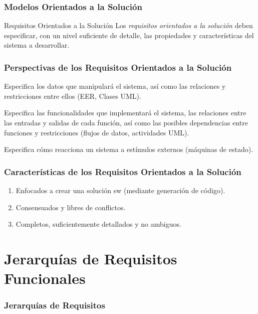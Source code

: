 \documentclass[slidestop,xcolor=pst,dvips,blue]{beamer}
\begin{document}
\begin{frame}[c]
    \frametitle{Modelos Orientados a la Solución}
    \begin{block}{Requisitos Orientados a la Solución}
        Los \emph{requisitos orientados a la solución} deben especificar, con un nivel suficiente de detalle, las propiedades y características del sistema a desarrollar.
    \end{block}
\end{frame}

\begin{frame}[c]
    \frametitle{Perspectivas de los Requisitos Orientados a la Solución}
    \begin{description}[<+->]
        \item[Datos] Especifica los datos que manipulará el sistema, así como las relaciones y restricciones entre ellos (EER, Clases UML).
        \item[Funcional] Especifica las funcionalidades que implementará el sistema, las relaciones entre las entradas y salidas de cada función, así como las posibles dependencias entre funciones y restricciones (flujos de datos, actividades UML).
        \item[Comportamiento] Especifica cómo reacciona un sistema a estímulos externos (máquinas de estado).
    \end{description}
\end{frame}

\begin{frame}[c]
    \frametitle{Características de los Requisitos Orientados a la Solución}
    \begin{enumerate}[<+->]
        \item Enfocados a crear una solución sw (mediante generación de código).
        \item Consensuados y libres de conflictos.
        \item Completos, suficientemente detallados y no ambiguos.
    \end{enumerate}
\end{frame}

\section{Jerarquías de Requisitos Funcionales}

\begin{frame}
    \frametitle{Jerarquías de Requisitos}
\end{frame}
\end{document}

